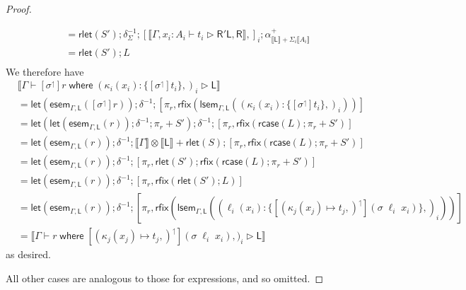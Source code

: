 \documentclass[acmsmall,screen,review]{acmart}
\newcommand{\ms}[1]{\ensuremath{\mathsf{#1}}}
\newcommand{\lto}{:}
\newcommand{\where}[2]{#1\;\ms{where}\;#2}
\newcommand{\wbranch}[3]{#1(#2) \lto \{#3\}}
\newcommand{\lupg}[1]{{#1}^\upharpoonleft}
\newcommand{\bhyp}[2]{#1 : #2}
\newcommand{\haslb}[3]{#1 \vdash #2 \rhd #3}
\newcommand{\dnt}[1]{\llbracket{#1}\rrbracket}
\newcommand{\entrymor}[3]{\ms{esem}_{#1, #3}(#2)}
\newcommand{\loopmor}[3]{\ms{lsem}_{#1, #3}(#2)}
\newcommand{\lmor}[1]{\ms{let}(#1)}
\newcommand{\rlmor}[1]{\ms{rlet}(#1)}
\newcommand{\rcase}[1]{\ms{rcase}(#1)}
\newcommand{\rfix}[1]{\ms{rfix}(#1)}
\begin{document}
\begin{proof}
\begin{itemize}[leftmargin=*]
\begin{equation}
\begin{aligned}
        & = \rlmor{S'} ; \delta^{-1}_{\Sigma}
          ; [\dnt{\haslb{\Gamma, \bhyp{x_i}{A_i}}{t_i}{\ms{R}'}{\ms{L}, \ms{R}}},]_i
          ; \alpha^+_{\dnt{\ms{L}} + \Sigma_i \dnt{A_i}} \\
        & = \rlmor{S'} ; L \\
      \end{aligned}
    \end{equation}
    We therefore have
    \begin{equation}
      \begin{aligned}
        & \dnt{\haslb{\Gamma}
          {\where{[\lupg{\sigma}]r}{(\wbranch{\kappa_i}{x_i}{[\lupg{\sigma}]t_i},)_i}}
          {\ms{L}}} \\
        & = \lmor{\entrymor{\Gamma}{[\lupg{\sigma}]r}{\ms{L}}} ; \delta^{-1} ; [\pi_r,
          \rfix{\loopmor{\Gamma}{(\wbranch{\kappa_i}{x_i}{[\lupg{\sigma}]t_i},)_i}{\ms{L}}}] \\
        & = \lmor{\lmor{\entrymor{\Gamma}{r}{\ms{L}}} ; \delta^{-1} ; \pi_r + S'} ; \delta^{-1}
          ; [
              \pi_r,
              \rfix{\rcase{L} ; \pi_r + S'}
          ] \\
        & = \lmor{\entrymor{\Gamma}{r}{\ms{L}}} ; \delta^{-1} 
          ; \dnt{\Gamma} \otimes \dnt{\ms{L}} + \rlmor{S}
          ; [
            \pi_r,
            \rfix{\rcase{L} ; \pi_r + S'}
          ] \\
        & = \lmor{\entrymor{\Gamma}{r}{\ms{L}}} ; \delta^{-1} 
        ; [
          \pi_r,
          \rlmor{S'}
          ; \rfix{\rcase{L} ; \pi_r + S'}
        ] \\
        & = \lmor{\entrymor{\Gamma}{r}{\ms{L}}} ; \delta^{-1} 
        ; [
          \pi_r,
          \rfix{\rlmor{S'} ; L}
        ] \\
        & = \lmor{\entrymor{\Gamma}{r}{\ms{L}}} ; \delta^{-1} 
        ; [
          \pi_r,
          \rfix{
            \loopmor{\Gamma}{(\wbranch{\ell_i}{x_i}
                    {[\lupg{(\kappa_j(x_j) \mapsto t_j,)}](\sigma\;\ell_i\;x_i)},)_i}{\ms{L}}}
        ] \\
        & = \dnt{\haslb{\Gamma}
          {\where{r}{[\lupg{(\kappa_j(x_j) \mapsto t_j,)}](\sigma\;\ell_i\;x_i)},)_i}{\ms{L}}}
      \end{aligned}
    \end{equation}
    as desired.
  \end{itemize}
  All other cases are analogous to those for expressions, and so omitted.
\end{proof}
\end{document}
